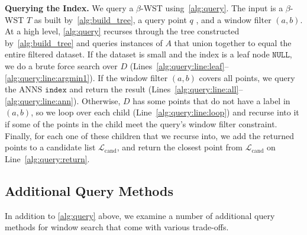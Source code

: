 \documentclass{article}
\theoremstyle{plain}
\theoremstyle{definition}
\theoremstyle{remark}
\begin{document}
\textbf{Querying the Index.} We query a $\beta$-WST using~\cref{alg:query}. The input is a $\beta$-WST $T$ as built by~\cref{alg:build_tree}, a query point $q$ , and a window filter $(a,b)$. At a high level, \cref{alg:query} recurses through the tree constructed by~\cref{alg:build_tree} and queries instances of $A$ that union together to equal the entire filtered dataset. If the dataset is small and the index is a leaf node $\texttt{NULL}$, we do a brute force search over $D$ (Lines~\ref{alg:query:line:leaf}--\ref{alg:query:line:argmin1}). If the window filter $(a,b)$ covers all points, we query the ANNS $\texttt{index}$ and return the result (Lines~\ref{alg:query:line:all}--\ref{alg:query:line:ann}). 
Otherwise, $D$ has some points that do not have a label in $(a, b)$, so we loop over each child (Line~\ref{alg:query:line:loop}) and recurse into it if some of the points in the child meet the query's window filter constraint. Finally, for each one of these children that we recurse into, we add the returned points to a candidate list $\mathcal{L}_{\text{cand}}$, and return the closest point from $\mathcal{L}_{\text{cand}}$ on Line~\ref{alg:query:return}. 

\subsection{Additional Query Methods}
\label{sec:query_methods}

In addition to \cref{alg:query} above, we examine a number of additional query methods for window search that come with various trade-offs.
\end{document}
